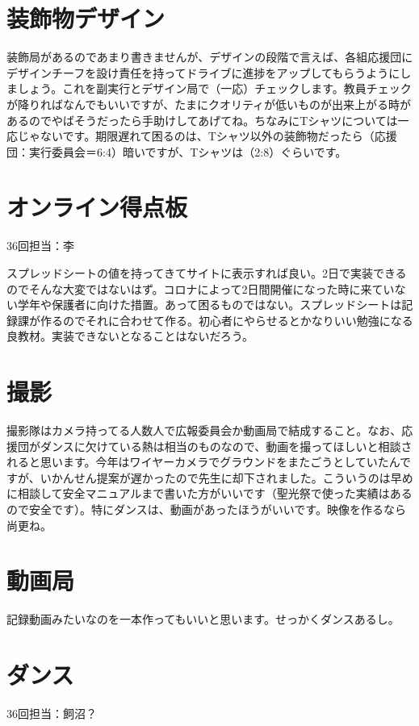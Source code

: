 \documentclass[a4paper]{ltjsreport}
\begin{document}
\section{装飾物デザイン}
装飾局があるのであまり書きませんが、デザインの段階で言えば、各組応援団にデザインチーフを設け責任を持ってドライブに進捗をアップしてもらうようにしましょう。これを副実行とデザイン局で（一応）チェックします。教員チェックが降りればなんでもいいですが、たまにクオリティが低いものが出来上がる時があるのでやばそうだったら手助けしてあげてね。ちなみにTシャツについては一応じゃないです。期限遅れて困るのは、Tシャツ以外の装飾物だったら（応援団：実行委員会＝6:4）暗いですが、Tシャツは（2:8）ぐらいです。

\section{オンライン得点板}
36回担当：李\vspace{3mm}

スプレッドシートの値を持ってきてサイトに表示すれば良い。2日で実装できるのでそんな大変ではないはず。コロナによって2日間開催になった時に来ていない学年や保護者に向けた措置。あって困るものではない。スプレッドシートは記録課が作るのでそれに合わせて作る。初心者にやらせるとかなりいい勉強になる良教材。実装できないとなることはないだろう。

\section{撮影}
撮影隊はカメラ持ってる人数人で広報委員会か動画局で結成すること。なお、応援団がダンスに欠けている熱は相当のものなので、動画を撮ってほしいと相談されると思います。今年はワイヤーカメラでグラウンドをまたごうとしていたんですが、いかんせん提案が遅かったので先生に却下されました。こういうのは早めに相談して安全マニュアルまで書いた方がいいです（聖光祭で使った実績はあるので安全です）。特にダンスは、動画があったほうがいいです。映像を作るなら尚更ね。

\section{動画局}
記録動画みたいなのを一本作ってもいいと思います。せっかくダンスあるし。

\section{ダンス}
36回担当：飼沼？\vspace{3mm}
\end{document}
